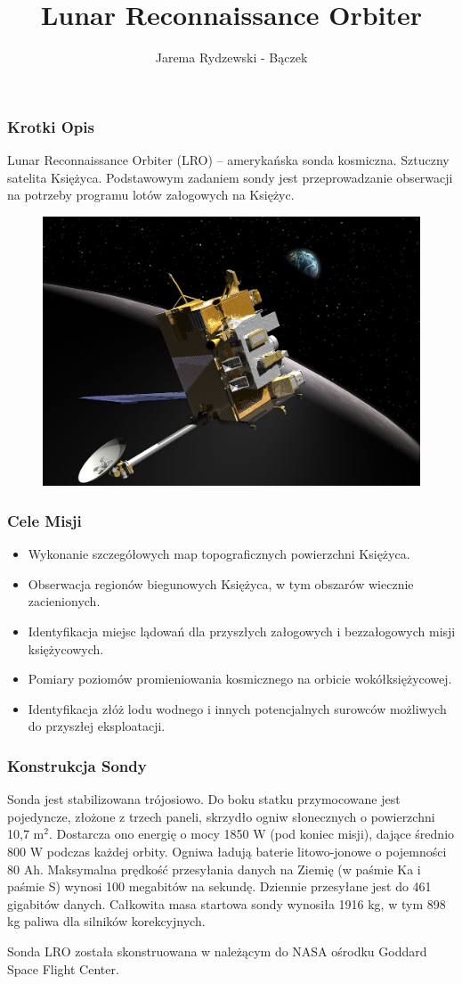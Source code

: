 \documentclass[]{beamer}
\author{Jarema Rydzewski - Bączek}
\title{Lunar Reconnaissance Orbiter}
\date{}
\begin{document}
\frame
{
\maketitle
}
\frame
{
\frametitle{Krotki Opis}
Lunar Reconnaissance Orbiter (LRO) – amerykańska sonda kosmiczna. Sztuczny satelita Księżyca. Podstawowym zadaniem sondy jest przeprowadzanie obserwacji na potrzeby programu lotów załogowych na Księżyc.
\cite{Wikipedia}
\begin{center}
\begin{figure}
\includegraphics[scale=0.65]{sonda.jpg}
\end{figure}
\end{center}
}
\frame
{
\frametitle{Cele Misji}
\begin{itemize}
\item Wykonanie szczegółowych map topograficznych powierzchni Księżyca.
\item Obserwacja regionów biegunowych Księżyca, w tym obszarów wiecznie zacienionych.
\item Identyfikacja miejsc lądowań dla przyszłych załogowych i bezzałogowych misji księżycowych.
\item Pomiary poziomów promieniowania kosmicznego na orbicie wokółksiężycowej.
\item Identyfikacja złóż lodu wodnego i innych potencjalnych surowców możliwych do przyszłej eksploatacji.
\end{itemize}
}
\frame
{
\frametitle{Konstrukcja Sondy}
Sonda jest stabilizowana trójosiowo. Do boku statku przymocowane jest pojedyncze, złożone z trzech paneli, skrzydło ogniw słonecznych o powierzchni 10,7 m$^2$. Dostarcza ono energię o mocy 1850 W (pod koniec misji), dające średnio 800 W podczas każdej orbity. Ogniwa ładują baterie litowo-jonowe o pojemności 80 Ah. Maksymalna prędkość przesyłania danych na Ziemię (w paśmie Ka i paśmie S) wynosi 100 megabitów na sekundę. Dziennie przesyłane jest do 461 gigabitów danych. Całkowita masa startowa sondy wynosiła 1916 kg, w tym 898 kg paliwa dla silników korekcyjnych.

Sonda LRO została skonstruowana w należącym do NASA ośrodku Goddard Space Flight Center.
}
\end{document}
